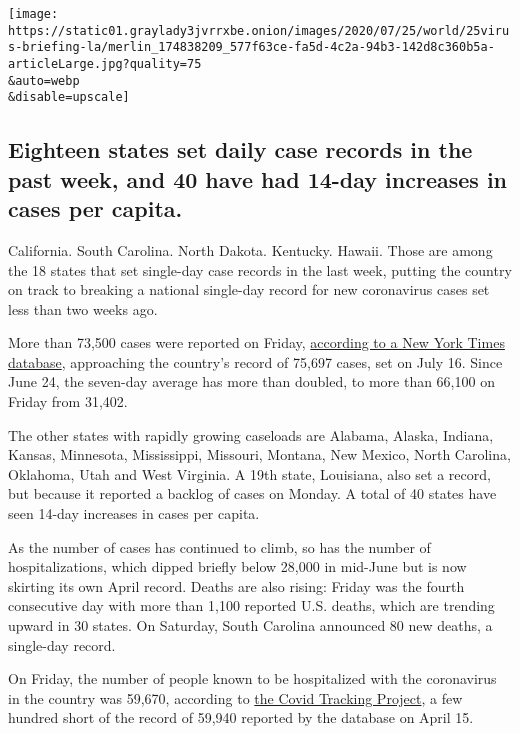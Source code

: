 \texttt{[image: https://static01.graylady3jvrrxbe.onion/images/2020/07/25/world/25virus-briefing-la/merlin\_174838209\_577f63ce-fa5d-4c2a-94b3-142d8c360b5a-articleLarge.jpg?quality=75\\\&auto=webp\\\&disable=upscale]}

\hypertarget{eighteen-states-set-daily-case-records-in-the-past-week-and-40-have-had-14-day-increases-in-cases-per-capita}{%
\subsection{Eighteen states set daily case records in the past week, and
40 have had 14-day increases in cases per
capita.}\label{eighteen-states-set-daily-case-records-in-the-past-week-and-40-have-had-14-day-increases-in-cases-per-capita}}

California. South Carolina. North Dakota. Kentucky. Hawaii. Those are
among the 18 states that set single-day case records in the last week,
putting the country on track to breaking a national single-day record
for new coronavirus cases set less than two weeks ago.

More than 73,500 cases were reported on Friday,
\href{https://www.nytimes3xbfgragh.onion/interactive/2020/us/coronavirus-us-cases.html}{according
to a New York Times database}, approaching the country's record of
75,697 cases, set on July 16. Since June 24, the seven-day average has
more than doubled, to more than 66,100 on Friday from 31,402.

The other states with rapidly growing caseloads are Alabama, Alaska,
Indiana, Kansas, Minnesota, Mississippi, Missouri, Montana, New Mexico,
North Carolina, Oklahoma, Utah and West Virginia. A 19th state,
Louisiana, also set a record, but because it reported a backlog of cases
on Monday. A total of 40 states have seen 14-day increases in cases per
capita.

As the number of cases has continued to climb, so has the number of
hospitalizations, which dipped briefly below 28,000 in mid-June but is
now skirting its own April record. Deaths are also rising: Friday was
the fourth consecutive day with more than 1,100 reported U.S. deaths,
which are trending upward in 30 states. On Saturday, South Carolina
announced 80 new deaths, a single-day record.

On Friday, the number of people known to be hospitalized with the
coronavirus in the country was 59,670, according to
\href{https://covidtracking.com/data/us-daily}{the Covid Tracking
Project}, a few hundred short of the record of 59,940 reported by the
database on April 15.

